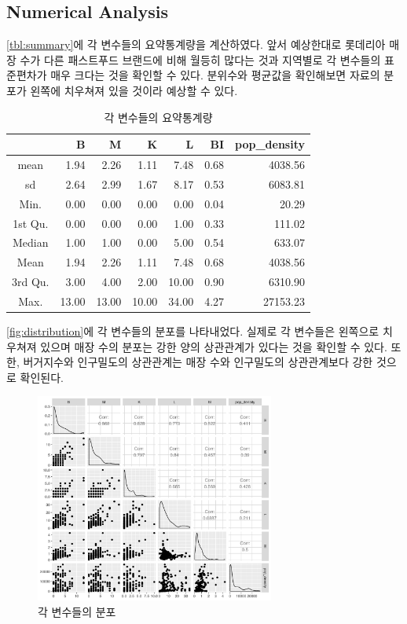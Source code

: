 \documentclass{scrartcl}
\begin{document}
\subsection{Numerical Analysis}\label{subsec:eda:numeric}

\autoref{tbl:summary}에 각 변수들의 요약통계량을 계산하였다. 앞서 예상한대로 롯데리아 매장 수가 다른 패스트푸드 브랜드에 비해 월등히 많다는 것과 지역별로 각 변수들의 표준편차가 매우 크다는 것을 확인할 수 있다. 분위수와 평균값을 확인해보면 자료의 분포가 왼쪽에 치우쳐져 있을 것이라 예상할 수 있다. 

\begin{table}[ht]
    \centering
    \begin{tabular}{c|rrrrrr}
      \hline
     & B & M & K & L & BI & pop\_density \\ 
     \hline
       mean & 1.94 & 2.26 & 1.11 & 7.48 & 0.68 & 4038.56 \\ 
       sd & 2.64 & 2.99 & 1.67 & 8.17 & 0.53 & 6083.81 \\ 
       Min. & 0.00 & 0.00 & 0.00 & 0.00 & 0.04 & 20.29 \\ 
       1st Qu. & 0.00 & 0.00 & 0.00 & 1.00 & 0.33 & 111.02 \\ 
       Median & 1.00 & 1.00 & 0.00 & 5.00 & 0.54 & 633.07 \\ 
       Mean & 1.94 & 2.26 & 1.11 & 7.48 & 0.68 & 4038.56 \\ 
       3rd Qu. & 3.00 & 4.00 & 2.00 & 10.00 & 0.90 & 6310.90 \\ 
       Max. & 13.00 & 13.00 & 10.00 & 34.00 & 4.27 & 27153.23 \\ 
    \hline
    \end{tabular}
    \caption{각 변수들의 요약통계량}\label{tbl:summary}
\end{table}

\autoref{fig:distribution}에 각 변수들의 분포를 나타내었다. 실제로 각 변수들은 왼쪽으로 치우쳐져 있으며 매장 수의 분포는 강한 양의 상관관계가 있다는 것을 확인할 수 있다. 또한, 버거지수와 인구밀도의 상관관계는 매장 수와 인구밀도의 상관관계보다 강한 것으로 확인된다. 
\begin{figure}
    \centering
    \includegraphics[width=0.7\textwidth]{../figs/dist_sig.png}
    \caption{각 변수들의 분포}\label{fig:distribution}
\end{figure}
\end{document}
